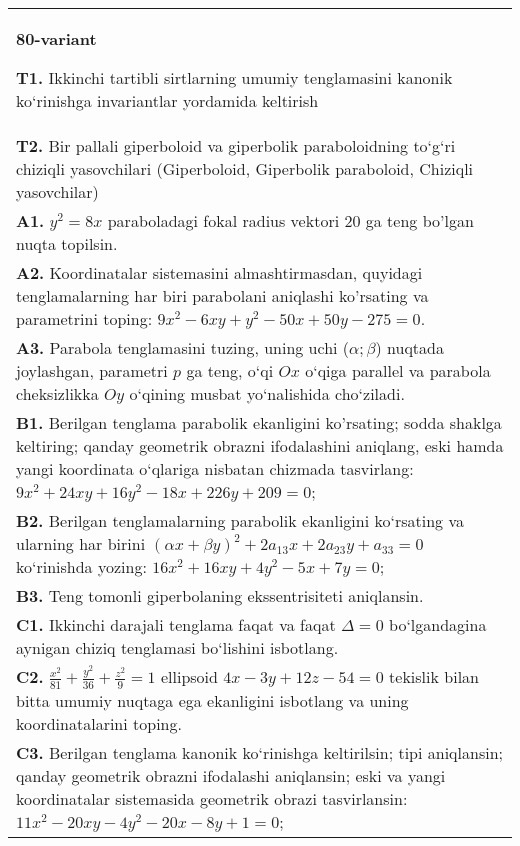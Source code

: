 \documentclass{article}
\begin{document}
\begin{tabular}{m{17cm}}
\textbf{80-variant}
\newline

\textbf{T1.} Ikkinchi tartibli sirtlarning umumiy tenglamasini kanonik ko‘rinishga invariantlar yordamida keltirish \\
\textbf{T2.} Bir pallali giperboloid va giperbolik paraboloidning to‘g‘ri chiziqli yasovchilari (Giperboloid, Giperbolik paraboloid, Chiziqli yasovchilar) \\
\textbf{A1.} $y^2=8 x$ paraboladagi fokal radius vektori 20 ga teng bo'lgan nuqta topilsin. \\
\textbf{A2.} Koordinatalar sistemasini almashtirmasdan, quyidagi tenglamalarning har biri parabolani aniqlashi ko'rsating va parametrini toping: $9 x^2-6 x y+y^2-50 x+50 y-275=0$. \\
\textbf{A3.} Parabola tenglamasini tuzing, uning uchi ($\alpha; \beta$) nuqtada joylashgan, parametri $p$ ga teng, o‘qi $Ox$ o‘qiga parallel va parabola cheksizlikka $Oy$ o‘qining musbat yo‘nalishida cho‘ziladi. \\
\textbf{B1.} Berilgan tenglama parabolik ekanligini ko'rsating; sodda shaklga keltiring; qanday geometrik obrazni ifodalashini aniqlang, eski hamda yangi koordinata o‘qlariga nisbatan chizmada tasvirlang: $9 x^2+24 x y+16 y^2-18 x+226 y+209=0$; \\
\textbf{B2.} Berilgan tenglamalarning parabolik ekanligini ko‘rsating va ularning har birini $(\alpha x+\beta y)^2+2 a_{13} x+2 a_{23} y+a_{33}=0$ ko‘rinishda yozing: $16 x^2+16 x y+4 y^2-5 x+7 y=0$; \\
\textbf{B3.} Teng tomonli giperbolaning ekssentrisiteti aniqlansin. \\
\textbf{C1.} Ikkinchi darajali tenglama faqat va faqat $\Delta=0$ bo‘lgandagina aynigan chiziq tenglamasi bo‘lishini isbotlang. \\
\textbf{C2.} $\frac{x^2}{81}+\frac{y^2}{36}+\frac{z^2}{9}=1$ ellipsoid $4 x-3 y+12 z-54=0$ tekislik bilan bitta umumiy nuqtaga ega ekanligini isbotlang va uning koordinatalarini toping. \\
\textbf{C3.} Berilgan tenglama kanonik ko‘rinishga keltirilsin; tipi aniqlansin; qanday geometrik obrazni ifodalashi aniqlansin; eski va yangi koordinatalar sistemasida geometrik obrazi tasvirlansin: $11 x^2-20 x y-4 y^2-20 x-8 y+1=0$; \\

\end{tabular}
\vspace{1cm}
\end{document}
